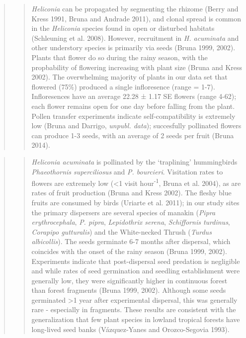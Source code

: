 \documentclass[
  12pt,
  man, donotrepeattitle,floatsintext]{apa6}
\begin{document}
\begin{quote}
\begin{quote}
\emph{Heliconia} can be propagated by segmenting the rhizome (Berry and Kress 1991, Bruna and Andrade 2011), and clonal spread is common in the \emph{Heliconia} species found in open or disturbed habitats (Schleuning et al. 2008). However, recruitment in \emph{H. acuminata} and other understory species is primarily via seeds (Bruna 1999, 2002). Plants that flower do so during the rainy season, with the propbability of flowering increasing with plant size (Bruna and Kress 2002). The overwhelming majority of plants in our data set that flowered (75\%) produced a single infloresence (range = 1-7). Infloresences have an average 22.28 ± 1.17 SE flowers (range 4-62); each flower remains open for one day before falling from the plant. Pollen transfer experiments indicate self-compatibility is extremely low (Bruna and Darrigo, \emph{unpubl. data}); succesfully pollinated flowers can produce 1-3 seeds, with an average of 2 seeds per fruit (Bruna 2014).
\end{quote}
\end{quote}

\begin{quote}
\begin{quote}
\emph{Heliconia acuminata} is pollinated by the `traplining' hummingbirds \emph{Phaeothornis superciliosus} and \emph{P. bourcieri}. Visitation rates to flowers are extremely low (\textless1 visit hour\textsuperscript{-1}, Bruna et al. 2004), as are rates of fruit production (Bruna and Kress 2002). The fleshy blue fruits are consumed by birds (Uriarte et al. 2011); in our study sites the primary dispersers are several species of manakin (\emph{Pipra erythrocephala}, \emph{P. pipra}, \emph{Lepidothrix serena}, \emph{Schiffornis turdinus}, \emph{Corapipo gutturalis}) and the White-necked Thrush (\emph{Turdus albicollis}). The seeds germinate 6-7 months after dispersal, which coincides with the onset of the rainy season (Bruna 1999, 2002). Experiments indicate that post-dispersal seed predation is negligible and while rates of seed germination and seedling establishment were generally low, they were significantly higher in continuous forest than forest fragments (Bruna 1999, 2002). Although some seeds germinated \textgreater1 year after experimental dispersal, this was generally rare - especially in fragments. These results are consistent with the generalization that few plant species in lowland tropical forests have long-lived seed banks (Vázquez-Yanes and Orozco-Segovia 1993).
\end{quote}
\end{quote}
\end{document}
